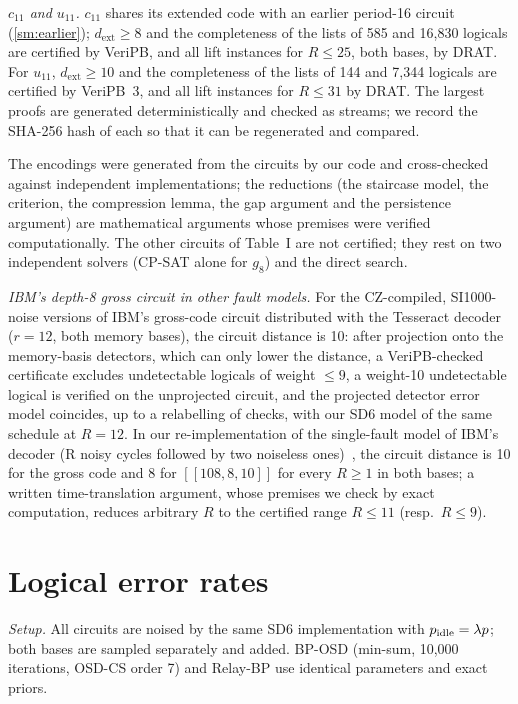 \documentclass[aps,prl,twocolumn,superscriptaddress,nofootinbib]{revtex4-2}
\newif\ifshowclaimtags \showclaimtagsfalse
\newcommand{\cl}[1]{\ifshowclaimtags\textsuperscript{\textcolor{blue}{\scriptsize[#1]}}\fi}
\newcommand{\dext}{d_{\mathrm{ext}}}
\newcommand{\code}[1]{[[#1]]}
\begin{document}
\emph{$c_{11}$ and $u_{11}$.} $c_{11}$ shares its extended code with an earlier period-16
circuit (\ref{sm:earlier}); $\dext\ge8$ and the completeness of the lists of 585 and 16,830
logicals are certified by VeriPB, and all lift instances for $R\le25$, both bases, by DRAT.
For $u_{11}$, $\dext\ge10$ and the completeness of the lists of 144 and 7,344 logicals are
certified by VeriPB~3, and all lift instances for $R\le31$ by DRAT. The largest proofs are
generated deterministically and checked as streams; we record the SHA-256 hash of each so
that it can be regenerated and compared.

The encodings were generated from the circuits by our code and cross-checked against
independent implementations; the reductions (the staircase model, the criterion, the
compression lemma, the gap argument and the persistence argument) are mathematical
arguments whose premises were verified computationally. The other circuits of Table~I are
not certified; they rest on two independent solvers (CP-SAT alone for $g_8$) and the direct search.

\emph{IBM's depth-8 gross circuit in other fault models.} For the CZ-compiled,
SI1000-noise versions of IBM's gross-code circuit distributed with the Tesseract
decoder~\cite{Tesseract2025} ($r=12$, both memory bases), the circuit distance is 10: after
projection onto the memory-basis detectors, which can only lower the distance, a
VeriPB-checked certificate excludes undetectable logicals of weight $\le9$, a weight-10
undetectable logical is verified on the unprojected circuit, and the projected detector error
model coincides, up to a relabelling of checks, with our SD6 model of the same schedule at
$R=12$. In our re-implementation of the single-fault model of IBM's decoder (R noisy cycles
followed by two noiseless ones)~\cite{Bravyi2024,Crocker2026}, the circuit distance is 10 for
the gross code and 8 for $\code{108,8,10}$ for every $R\ge1$ in both bases; a written
time-translation argument, whose premises we check by exact computation, reduces arbitrary
$R$ to the certified range $R\le11$ (resp.\ $R\le9$).

\section{Logical error rates}\label{sm:ler}\cl{L-17,L-18}
\emph{Setup.} All circuits are noised by the same SD6 implementation with $p_{\rm
idle}=\lambda p$; both bases are sampled separately and added. BP-OSD (min-sum, 10,000
iterations, OSD-CS order 7) and Relay-BP use identical parameters and exact priors.
\end{document}
